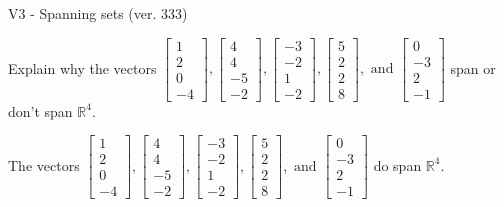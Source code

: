 \begin{exercise}
  \begin{exerciseTitle}V3 - Spanning sets (ver. 333)\end{exerciseTitle}
  \begin{exerciseStatement}
    Explain why the vectors \(\left[\begin{array}{r}
1 \\
2 \\
0 \\
-4
\end{array}\right] , \left[\begin{array}{r}
4 \\
4 \\
-5 \\
-2
\end{array}\right] , \left[\begin{array}{r}
-3 \\
-2 \\
1 \\
-2
\end{array}\right] , \left[\begin{array}{r}
5 \\
2 \\
2 \\
8
\end{array}\right] , \text{ and } \left[\begin{array}{r}
0 \\
-3 \\
2 \\
-1
\end{array}\right]\) span or don't span \(\mathbb{R}^4\). 
	


  \end{exerciseStatement}
  \begin{exerciseAnswer}
   The vectors \(\left[\begin{array}{r}
1 \\
2 \\
0 \\
-4
\end{array}\right] , \left[\begin{array}{r}
4 \\
4 \\
-5 \\
-2
\end{array}\right] , \left[\begin{array}{r}
-3 \\
-2 \\
1 \\
-2
\end{array}\right] , \left[\begin{array}{r}
5 \\
2 \\
2 \\
8
\end{array}\right] , \text{ and } \left[\begin{array}{r}
0 \\
-3 \\
2 \\
-1
\end{array}\right]\) 
  	 do  
	span \(\mathbb{R}^4\).
  



\end{exerciseAnswer}
\end{exercise}
